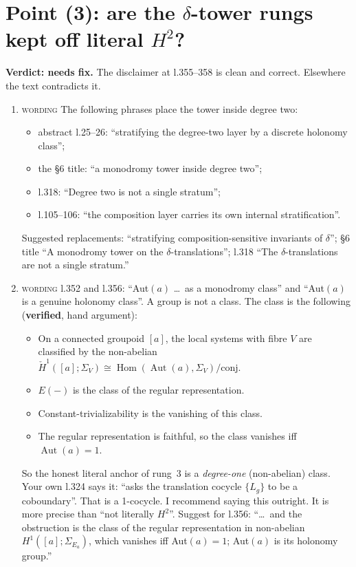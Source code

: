 \documentclass[11pt]{article}
\newcommand{\iss}[1]{\textsc{#1}}
\begin{document}
\section{Point (3): are the $\delta$-tower rungs kept off literal $H^2$?}
\textbf{Verdict: needs fix.} The disclaimer at l.355--358 is clean and correct. Elsewhere the text
contradicts it.
\begin{enumerate}[label=\textbf{3.\arabic*},leftmargin=*]
\item \iss{wording} The following phrases place the tower inside degree two:
\begin{itemize}[leftmargin=1.2em]
\item abstract l.25--26: ``stratifying the degree-two layer by a discrete holonomy class'';
\item the \S6 title: ``a monodromy tower inside degree two'';
\item l.318: ``Degree two is not a single stratum'';
\item l.105--106: ``the composition layer carries its own internal stratification''.
\end{itemize}
Suggested replacements: ``stratifying composition-sensitive invariants of $\delta$''; \S6 title
``A monodromy tower on the $\delta$-translations''; l.318 ``The $\delta$-translations are not a
single stratum.''

\item \iss{wording} l.352 and l.356: ``Aut$(a)$ \dots\ as a monodromy class'' and ``Aut$(a)$ is a
genuine holonomy class''. A group is not a class. The class is the following (\textbf{verified},
hand argument):
\begin{itemize}[leftmargin=1.2em]
\item On a connected groupoid $[a]$, the local systems with fibre $V$ are classified by the
non-abelian $\check H^1([a];\Sigma_V)\cong\operatorname{Hom}(\operatorname{Aut}(a),\Sigma_V)/\text{conj}$.
\item $E(-)$ is the class of the regular representation.
\item Constant-trivializability is the vanishing of this class.
\item The regular representation is faithful, so the class vanishes iff $\operatorname{Aut}(a)=1$.
\end{itemize}
So the honest literal anchor of rung~3 is a \emph{degree-one} (non-abelian) class. Your own l.324
says it: ``asks the translation cocycle $\{L_g\}$ to be a coboundary''. That is a 1-cocycle. I
recommend saying this outright. It is more precise than ``not literally $H^2$''. Suggest for
l.356: ``\dots\ and the obstruction is the class of the regular representation in non-abelian
$H^1([a];\Sigma_{E_a})$, which vanishes iff Aut$(a)=1$; Aut$(a)$ is its holonomy group.''


\end{enumerate}
\end{document}
